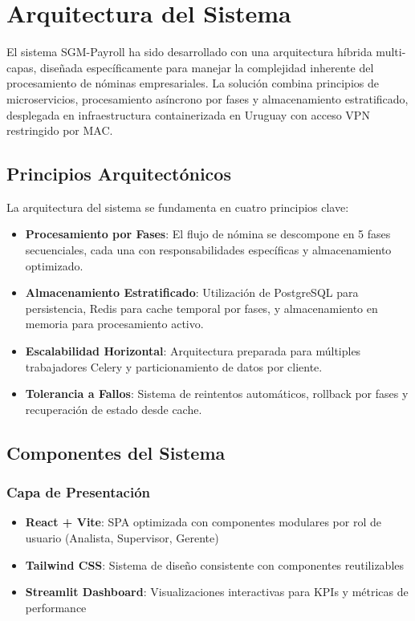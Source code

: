 
\section{Arquitectura del Sistema}

El sistema SGM-Payroll ha sido desarrollado con una arquitectura híbrida multi-capas, diseñada específicamente para manejar la complejidad inherente del procesamiento de nóminas empresariales. La solución combina principios de microservicios, procesamiento asíncrono por fases y almacenamiento estratificado, desplegada en infraestructura containerizada en Uruguay con acceso VPN restringido por MAC.

\subsection{Principios Arquitectónicos}

La arquitectura del sistema se fundamenta en cuatro principios clave:

\begin{itemize}
    \item \textbf{Procesamiento por Fases}: El flujo de nómina se descompone en 5 fases secuenciales, cada una con responsabilidades específicas y almacenamiento optimizado.
    \item \textbf{Almacenamiento Estratificado}: Utilización de PostgreSQL para persistencia, Redis para cache temporal por fases, y almacenamiento en memoria para procesamiento activo.
    \item \textbf{Escalabilidad Horizontal}: Arquitectura preparada para múltiples trabajadores Celery y particionamiento de datos por cliente.
    \item \textbf{Tolerancia a Fallos}: Sistema de reintentos automáticos, rollback por fases y recuperación de estado desde cache.
\end{itemize}

\subsection{Componentes del Sistema}

\subsubsection{Capa de Presentación}
\begin{itemize}
    \item \textbf{React + Vite}: SPA optimizada con componentes modulares por rol de usuario (Analista, Supervisor, Gerente)
    \item \textbf{Tailwind CSS}: Sistema de diseño consistente con componentes reutilizables
    \item \textbf{Streamlit Dashboard}: Visualizaciones interactivas para KPIs y métricas de performance
\end{itemize}

